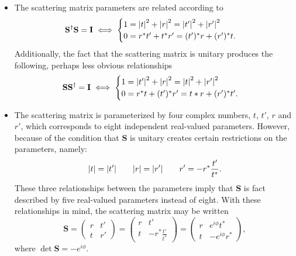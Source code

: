 \documentclass[11pt, a4paper]{article}
\renewcommand{\vec}[1]{\bm{#1}}  %
\newcommand{\mat}[1]{\mathbf{#1}}  %
\renewcommand{\S}{\vec{S}}  %
\renewcommand{\SS}{\mat{S}}  %
\begin{document}
\begin{itemize}
    \item The scattering matrix parameters are related according to
    \begin{equation*}
        \SS^{\dagger} \SS = \mathbf{I} \iff 
        \begin{cases}
            1 = \abs{t}^{2} + \abs{r}^{2} = \abs{t'}^{2} + \abs{r'}^{2}\\
            0 = r^{*} t' + t^{*} r' = (t')^{*} r + (r')^{*}t.
        \end{cases} 
    \end{equation*}
    Additionally, the fact that the scattering matrix is unitary produces the following, perhaps less obvious relationships
    \begin{equation*}
        \SS \SS^{\dagger} = \mathbf{I} \iff 
        \begin{cases}
            1 = \abs{t'}^{2} + \abs{r}^{2} = \abs{t}^{2} + \abs{r'}^{2}\\
            0 = r^{*}t + (t')^{*}r' = t*r + (r')^{*}t'.
        \end{cases}  
    \end{equation*}
    
    \item The scattering matrix is parameterized by four complex numbers, $ t $, $ t' $, $ r $ and $ r' $, which corresponds to eight independent real-valued parameters. However, because of the condition that $ \S $ is unitary creates certain restrictions on the parameters, namely:
    \begin{equation*}
        \abs{t} = \abs{t'} \qquad \abs{r} = \abs{r'} \qquad r' = -r^{*}\frac{t'}{t^{*}}.
    \end{equation*}
    These three relationships between the parameters imply that $ \SS $ is fact described by five real-valued parameters instead of eight. With these relationships in mind, the scattering matrix may be written
    \begin{equation*}
        \SS = 
        \begin{pmatrix}
            r & t'\\
            t & r'
        \end{pmatrix}
        = 
        \begin{pmatrix}
            r & t'\\
            t & - r^{*}\frac{t'}{t^{*}}
        \end{pmatrix}
        = 
        \begin{pmatrix}
            r & e^{i\phi}t^{*}\\
            t & - e^{i\phi}r^{*}
        \end{pmatrix},
    \end{equation*}
    where $ \det \SS = -e^{i\phi} $.
    
    
\end{itemize}
\end{document}
